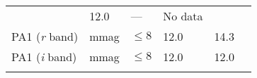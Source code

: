 \documentclass[DM,toc]{lsstdoc}
\begin{document}
\begin{longtable}[]{@{}llllll@{}}
\begin{minipage}[t]{0.17\columnwidth}
\end{minipage} & \begin{minipage}[t]{0.17\columnwidth}\raggedright\strut
12.0\strut
\end{minipage} & \begin{minipage}[t]{0.12\columnwidth}\raggedright\strut
---\strut
\end{minipage} & \begin{minipage}[t]{0.17\columnwidth}\raggedright\strut
No data\strut
\end{minipage}\tabularnewline
\begin{minipage}[t]{0.14\columnwidth}\raggedright\strut
PA1 (\emph{r} band)\strut
\end{minipage} & \begin{minipage}[t]{0.06\columnwidth}\raggedright\strut
mmag\strut
\end{minipage} & \begin{minipage}[t]{0.17\columnwidth}\raggedright\strut
\(\leq 8\)\strut
\end{minipage} & \begin{minipage}[t]{0.17\columnwidth}\raggedright\strut
12.0\strut
\end{minipage} & \begin{minipage}[t]{0.12\columnwidth}\raggedright\strut
14.3\strut
\end{minipage} & \begin{minipage}[t]{0.17\columnwidth}\raggedright\strut
\strut
\end{minipage}\tabularnewline
\begin{minipage}[t]{0.14\columnwidth}\raggedright\strut
PA1 (\emph{i} band)\strut
\end{minipage} & \begin{minipage}[t]{0.06\columnwidth}\raggedright\strut
mmag\strut
\end{minipage} & \begin{minipage}[t]{0.17\columnwidth}\raggedright\strut
\(\leq 8\)\strut
\end{minipage} & \begin{minipage}[t]{0.17\columnwidth}\raggedright\strut
12.0\strut
\end{minipage} & \begin{minipage}[t]{0.12\columnwidth}\raggedright\strut
12.0\strut
\end{minipage} & \begin{minipage}[t]{0.17\columnwidth}\raggedright\strut
\strut
\end{minipage}\tabularnewline
\begin{minipage}[t]{0.14\columnwidth}\raggedright\strut

\end{minipage}
\end{longtable}
\end{document}
